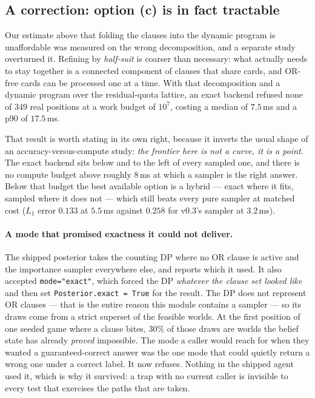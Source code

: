 \documentclass[11pt,a4paper]{article}
\begin{document}
\subsection{A correction: option (c) is in fact tractable}
\label{sec:clauses-correction}

Our estimate above that folding the clauses into the dynamic program is
unaffordable was measured on the wrong decomposition, and a separate study
overturned it. Refining by \emph{half-suit} is coarser than necessary: what
actually needs to stay together is a connected component of clauses that share
cards, and OR-free cards can be processed one at a time. With that
decomposition and a dynamic program over the residual-quota lattice, an exact
backend refused none of 349 real positions at a work budget of $10^7$, costing
a median of $7.5$\,ms and a p90 of $17.5$\,ms.

That result is worth stating in its own right, because it inverts the usual
shape of an accuracy-versus-compute study: \emph{the frontier here is not a
curve, it is a point}. The exact backend sits below and to the left of every
sampled one, and there is no compute budget above roughly $8$\,ms at which a
sampler is the right answer. Below that budget the best available option is a
hybrid --- exact where it fits, sampled where it does not --- which still beats
every pure sampler at matched cost ($L_1$ error $0.133$ at $5.5$\,ms against
$0.258$ for v0.3's sampler at $3.2$\,ms).

\paragraph{A mode that promised exactness it could not deliver.} The shipped
posterior takes the counting DP where no OR clause is active and the importance
sampler everywhere else, and reports which it used. It also accepted
\texttt{mode="exact"}, which forced the DP \emph{whatever the clause set looked
like} and then set \texttt{Posterior.exact = True} for the result. The DP does
not represent OR clauses --- that is the entire reason this module contains a
sampler --- so its draws come from a strict superset of the feasible worlds. At
the first position of one seeded game where a clause bites, $30\%$ of those
draws are worlds the belief state has already \emph{proved} impossible. The
mode a caller would reach for when they wanted a guaranteed-correct answer was
the one mode that could quietly return a wrong one under a correct label. It
now refuses. Nothing in the shipped agent used it, which is why it survived:
a trap with no current caller is invisible to every test that exercises the
paths that are taken.
\end{document}
